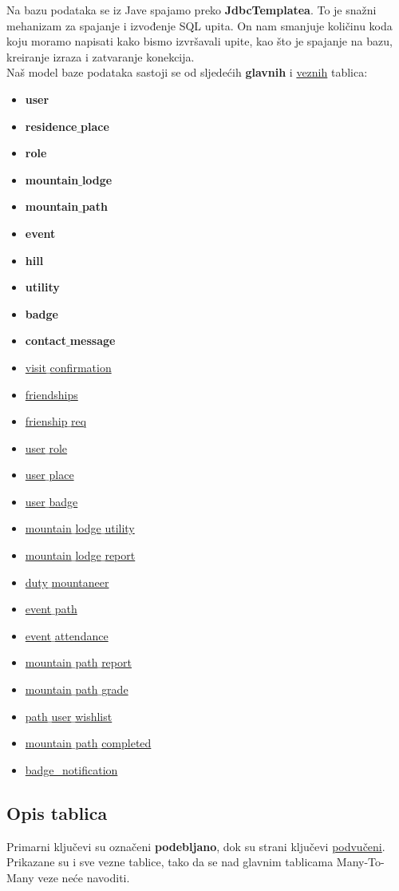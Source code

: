 		Na bazu podataka se iz Jave spajamo preko \textbf{JdbcTemplatea}. To je snažni mehanizam za spajanje i izvođenje SQL upita. On nam smanjuje količinu koda koju moramo napisati kako bismo izvršavali upite, kao što je spajanje na bazu, kreiranje izraza i zatvaranje konekcija. \\
		\newpage
	Naš model baze podataka sastoji se od sljedećih \textbf{glavnih} i \underline{veznih} tablica:
		\begin{itemize}[noitemsep]
		\item \textbf{user}
		\item \textbf{residence$\_$place}
		\item \textbf{role}
		\item \textbf{mountain$\_$lodge}
		\item \textbf{mountain$\_$path}
		\item \textbf{event}
		\item \textbf{hill}
		\item \textbf{utility}
		\item \textbf{badge}
		\item \textbf{contact$\_$message}
		\item \underline{visit$\_$confirmation}
		\item \underline{friendships}
		\item \underline{frienship$\_$req}
		\item \underline{user$\_$role}
		\item \underline{user$\_$place}
		\item \underline{user$\_$badge}
		\item \underline{mountain$\_$lodge$\_$utility}
		\item \underline{mountain$\_$lodge$\_$report}
		\item \underline{duty$\_$mountaneer}
		\item \underline{event$\_$path}
		\item \underline{event$\_$attendance}
		\item \underline{mountain$\_$path$\_$report}
		\item \underline{mountain$\_$path$\_$grade}
		\item \underline{path$\_$user$\_$wishlist}
		\item \underline{mountain$\_$path$\_$completed}
		\item \underline{badge\_notification}

\end{itemize}
		 \newpage
			\subsection{Opis tablica}
			Primarni ključevi su označeni \textbf{podebljano}, dok su strani ključevi \underline{podvučeni}. \\
			Prikazane su i sve vezne tablice, tako da se nad glavnim tablicama Many-To-Many veze neće navoditi.
			
